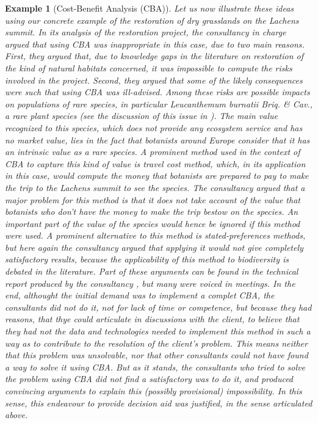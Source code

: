 \documentclass[preprint, french, english, 11pt, authoryear]{elsarticle}%
\newtheorem{example}{Example}
\begin{document}
\begin{example}[Cost-Benefit Analysis (CBA)]
Let us now illustrate these ideas using our concrete example of the restoration of dry grasslands on the Lachens summit. In its analysis of the restoration project, the consultancy in charge argued that using CBA was inappropriate in this case, due to two main reasons. First, they argued that, due to knowledge gaps in the literature on restoration of the kind of natural habitats concerned, it was impossible to compute the risks involved in the project. Second, they argued that some of the likely consequences were such that using CBA was ill-advised. Among these risks are possible impacts on populations of rare species, in particular \emph{Leucanthemum burnatii} Briq. \& Cav., a rare plant species (see the discussion of this issue in \cite{meinard_ethical_2016}). The main value recognized to this species, which does not provide any ecosystem service and has no market value, lies in the fact that botanists around Europe consider that it has an intrinsic value as a rare species. A prominent method used in the context of CBA to capture this kind of value is travel cost method, which, in its application in this case, would compute the money that botanists are prepared to pay to make the trip to the Lachens summit to see the species. The consultancy argued that a major problem for this method is that it does not take account of the value that botanists who don't have the money to make the trip bestow on the species. An important part of the value of the species would hence be ignored if this method were used. A prominent alternative to this method is stated-preferences methods, but here again the consultancy argued that applying it would not give completely satisfactory results, because the applicability of this method to biodiversity is debated in the literature. Part of these arguments can be found in the technical report produced by the consultancy \citep{meinard_etude_2015}, but many were voiced in meetings. In the end, althought the initial demand was to implement a complet CBA, the consultants did not do it, not for lack of time or competence, but because they had reasons, that thye could articulate in discussions with the client, to believe that they had not the data and technologies needed to implement this method in such a way as to contribute to the resolution of the client's problem. This means neither that this problem was unsolvable, nor that other consultants could not have found a way to solve it using CBA. But as it stands, the consultants who tried to solve the problem using CBA did not find a satisfactory was to do it, and produced convincing arguments to explain this (possibly provisional) impossibility. In this sense, this endeavour to provide decision aid was justified, in the sense articulated above. 
\end{example}
\end{document}
